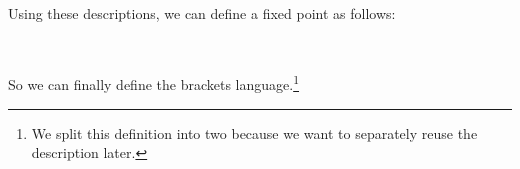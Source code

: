 \begin{code}
\<%
\\
%
\>[4]\AgdaSpace{}%
\AgdaSpace{}%
\AgdaSymbol{\{}\AgdaSymbol{\}}\AgdaSpace{}%
\AgdaSymbol{\AgdaUnderscore{}}\AgdaSpace{}%
\AgdaSpace{}%
\AgdaSpace{}%
%
\>[24]\AgdaSymbol{=}\AgdaSpace{}%
\AgdaSpace{}%
\AgdaSpace{}%
\AgdaSpace{}%
\AgdaSpace{}%
\AgdaSpace{}%
\<%
\\
%
\>[4]\AgdaSpace{}%
\AgdaSpace{}%
\AgdaSpace{}%
%
\>[18]\AgdaSymbol{=}\AgdaSpace{}%
\<%
\end{code}

Using these descriptions, we can define a fixed point as follows:

\begin{code}%
%
\>[4]\AgdaSpace{}%
\AgdaSpace{}%
\AgdaSymbol{(}\AgdaSpace{}%
\AgdaSymbol{:}\AgdaSpace{}%
\AgdaSymbol{)}\AgdaSpace{}%
\AgdaSymbol{:}\AgdaSpace{}%
\AgdaSpace{}%
\<%
\\
\>[4][@{}l@{\AgdaIndent{0}}]%
\>[8]\AgdaSpace{}%
\AgdaSymbol{:}\AgdaSpace{}%
\AgdaSpace{}%
\AgdaSpace{}%
\AgdaSpace{}%
\AgdaSpace{}%
\AgdaSpace{}%
\AgdaSpace{}%
\AgdaSpace{}%
\AgdaSpace{}%
\AgdaSpace{}%
\AgdaSpace{}%
\AgdaSpace{}%
\<%
\end{code}

So we can finally define the brackets language.\footnote{We split this definition into two because we want to separately reuse the description later.}

